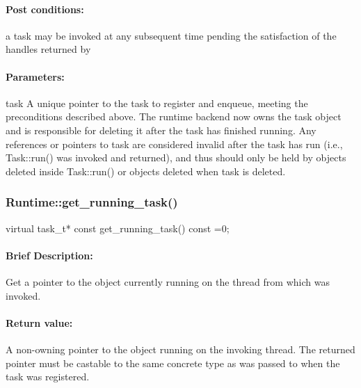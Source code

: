 \paragraph{Post conditions:} a task may be invoked at any subsequent time pending the satisfaction of the handles returned
       by 
     
\paragraph{Parameters:} 
\begin{compactdesc}
\item[task] A unique pointer to the task to register and enqueue, meeting the preconditions
       described above.  The runtime backend now owns the task object and is responsible for deleting it
       after the task has finished running.  Any references or pointers to task are considered
       invalid after the task has run (i.e., Task::run() was invoked and returned), and thus should only
       be held by objects deleted inside Task::run() or objects deleted when task is deleted.
\end{compactdesc}
     

\subsubsection{Runtime::get\_running\_task()}
\begin{CppCode}
virtual task_t* const
    get_running_task() const =0;
\end{CppCode}

\paragraph{Brief Description:} Get a pointer to the  object currently running on the thread 
from which  was invoked.

\paragraph{Return value:} A non-owning pointer to the  object running on the invoking
thread.  The returned pointer must be castable to the same concrete type as was passed to  when the task was registered.

